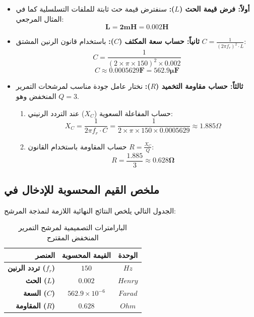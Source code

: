 \begin{itemize}
    \item \textbf{أولاً: فرض قيمة الحث ($L$):} سنفترض قيمة حث ثابتة للملفات التسلسلية كما في المثال المرجعي:
    \begin{equation*}
        \mathbf{L = 2 mH = 0.002 H}
    \end{equation*}

    \item \textbf{ثانياً: حساب سعة المكثف ($C$):} باستخدام قانون الرنين المشتق $C = \frac{1}{(2\pi f_r)^2 \cdot L}$:
    \begin{equation*}
        C = \frac{1}{(2 \times \pi \times 150)^2 \times 0.002}
    \end{equation*}
    \begin{equation*}
        C \approx \mathbf{0.0005629 F = 562.9 \mu F}
    \end{equation*}

    \item \textbf{ثالثاً: حساب مقاومة التخميد ($R$):} نختار عامل جودة مناسب لمرشحات التمرير المنخفض وهو \textbf{$Q = 3$}.
    \begin{enumerate}
        \item حساب المفاعلة السعوية ($X_C$) عند التردد الرنيني:
        \begin{equation*}
            X_C = \frac{1}{2\pi f_r \cdot C} = \frac{1}{2 \times \pi \times 150 \times 0.0005629} \approx 1.885 \Omega
        \end{equation*}
        \item حساب المقاومة باستخدام القانون $R = \frac{X_C}{Q}$:
        \begin{equation*}
            R = \frac{1.885}{3} \approx \mathbf{0.628 \Omega}
        \end{equation*}
    \end{enumerate}
\end{itemize}

\subsection{ملخص القيم المحسوبة للإدخال في }
الجدول التالي يلخص النتائج النهائية اللازمة لنمذجة المرشح:

\begin{table}[H]
\centering
\renewcommand{\arraystretch}{1.5}
\begin{tabular}{|r|c|c|}
\hline
\textbf{العنصر} & \textbf{القيمة المحسوبة} & \textbf{الوحدة} \\ \hline
\textbf{تردد الرنين ($f_r$)} & $150$ & $Hz$ \\ \hline
\textbf{الحث ($L$)} & $0.002$ & $Henry$ \\ \hline
\textbf{السعة ($C$)} & $562.9 \times 10^{-6}$ & $Farad$ \\ \hline
\textbf{المقاومة ($R$)} & $0.628$ & $Ohm$ \\ \hline
\end{tabular}
\caption{البارامترات التصميمية لمرشح التمرير المنخفض المقترح}
\label{tab:filter_design_summary}
\end{table}
